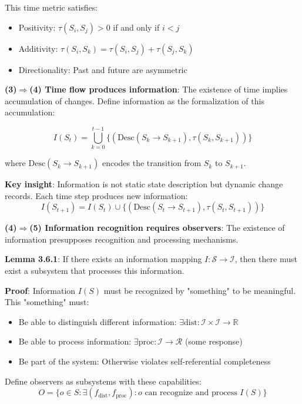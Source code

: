This time metric satisfies:
\begin{itemize}
\item Positivity: $\tau(S_i, S_j) > 0$ if and only if $i < j$
\item Additivity: $\tau(S_i, S_k) = \tau(S_i, S_j) + \tau(S_j, S_k)$
\item Directionality: Past and future are asymmetric
\end{itemize}

\textbf{(3)$\Rightarrow$(4) Time flow produces information}:
The existence of time implies accumulation of changes. Define information as the formalization of this accumulation:

\begin{equation}
I(S_t) = \bigcup_{k=0}^{t-1} \{(\text{Desc}(S_k \to S_{k+1}), \tau(S_k, S_{k+1}))\}
\end{equation}

where $\text{Desc}(S_k \to S_{k+1})$ encodes the transition from $S_k$ to $S_{k+1}$.

\textbf{Key insight}: Information is not static state description but dynamic change records. Each time step produces new information:
\begin{equation}
I(S_{t+1}) = I(S_t) \cup \{(\text{Desc}(S_t \to S_{t+1}), \tau(S_t, S_{t+1}))\}
\end{equation}

\textbf{(4)$\Rightarrow$(5) Information recognition requires observers}:
The existence of information presupposes recognition and processing mechanisms.

\textbf{Lemma 3.6.1}: If there exists an information mapping $I: \mathcal{S} \to \mathcal{I}$, then there must exist a subsystem that processes this information.
\label{thm:1.3}

\textbf{Proof}: Information $I(S)$ must be recognized by "something" to be meaningful. This "something" must:
\begin{itemize}
\item Be able to distinguish different information: $\exists \text{dist}: \mathcal{I} \times \mathcal{I} \to \mathbb{R}$
\item Be able to process information: $\exists \text{proc}: \mathcal{I} \to \mathcal{R}$ (some response)
\item Be part of the system: Otherwise violates self-referential completeness
\end{itemize}

Define observers as subsystems with these capabilities:
\begin{equation}
O = \{o \in S: \exists (f_{\text{dist}}, f_{\text{proc}}): o \text{ can recognize and process } I(S)\}
\end{equation}

